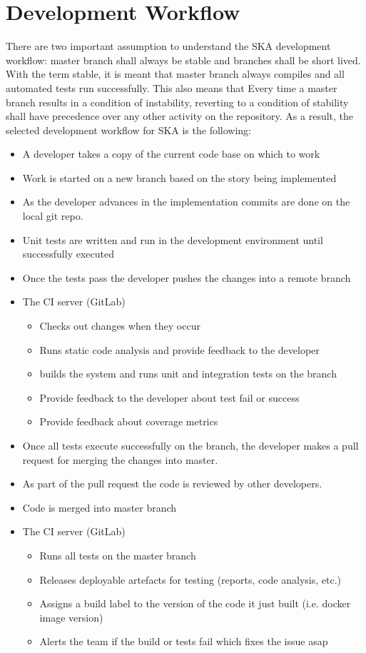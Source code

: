 \documentclass[a4paper]{spie}  %
\begin{document}
\section{Development Workflow}
There are two important assumption to understand the SKA development workflow: master branch shall always be stable and branches shall be short lived. With the term stable, it is meant that master branch always compiles and all automated tests run successfully. This also means that Every time a master branch results in a condition of instability, reverting to a condition of stability shall have
precedence over any other activity on the repository.
As a result, the selected development workflow for SKA is the following:
\begin{itemize}
    \item A developer takes a copy of the current code base on which to work
    \item Work is started on a new branch based on the story being implemented
    \item As the developer advances in the implementation commits are done on the local git repo.
    \item Unit tests are written and run in the development environment until successfully executed
    \item Once the tests pass the developer pushes the changes into a remote branch
    \item The CI server (GitLab)
    \begin{itemize}
        \item Checks out changes when they occur
        \item Runs static code analysis and provide feedback to the developer
        \item builds the system and runs unit and integration tests on the branch
        \item Provide feedback to the developer about test fail or success
        \item Provide feedback about coverage metrics
    \end{itemize}
    \item Once all tests execute successfully on the branch, the developer makes a pull request for merging the changes into master.
    \item As part of the pull request the code is reviewed by other developers.
    \item Code is merged into master branch
    \item The CI server (GitLab)
    \begin{itemize}
        \item Runs all tests on the master branch
        \item Releases deployable artefacts for testing (reports, code analysis, etc.)
        \item Assigns a build label to the version of the code it just built (i.e. docker image version)
        \item Alerts the team if the build or tests fail which fixes the issue asap
    \end{itemize}
\end{itemize}
\end{document}
